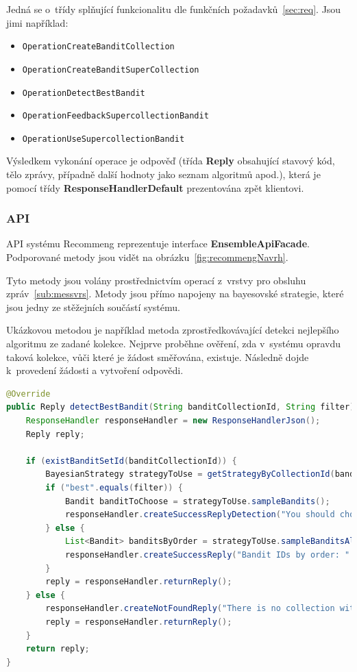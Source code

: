\documentclass[thesis=M,czech]{FITthesis}[2014/05/07]
\begin{document}
Jedná se o~třídy splňující funkcionalitu dle funkčních požadavků~\ref{sec:req}. Jsou jimi například:

\begin{itemize}
	\item \texttt{OperationCreateBanditCollection}
	\item \texttt{OperationCreateBanditSuperCollection}	
	\item \texttt{OperationDetectBestBandit}
	\item \texttt{OperationFeedbackSupercollectionBandit}
	\item \texttt{OperationUseSupercollectionBandit}			
\end{itemize}

Výsledkem vykonání operace je odpověď (třída \textbf{Reply} obsahující stavový kód, tělo zprávy, případně další hodnoty jako seznam algoritmů apod.), která je pomocí třídy \textbf{ResponseHandlerDefault} prezentována zpět klientovi.

\subsubsection{API}
API systému Recommeng reprezentuje interface \textbf{EnsembleApiFacade}. Podporované metody jsou vidět na obrázku~\ref{fig:recommengNavrh}.

Tyto metody jsou volány prostřednictvím operací z~vrstvy pro obsluhu zpráv~\ref{sub:messvrs}. Metody jsou přímo napojeny na bayesovské strategie, které jsou jedny ze stěžejních součástí systému.

Ukázkovou metodou je například metoda zprostředkovávající detekci nejlepšího algoritmu ze zadané kolekce. Nejprve proběhne ověření, zda v~systému opravdu taková kolekce, vůči které je žádost směřována, existuje. Následně dojde k~provedení žádosti a vytvoření odpovědi.

\begin{lstlisting}[language=java]
@Override
public Reply detectBestBandit(String banditCollectionId, String filter) {
    ResponseHandler responseHandler = new ResponseHandlerJson();
    Reply reply;

    if (existBanditSetId(banditCollectionId)) {
        BayesianStrategy strategyToUse = getStrategyByCollectionId(banditCollectionId);
        if ("best".equals(filter)) {
            Bandit banditToChoose = strategyToUse.sampleBandits();            
            responseHandler.createSuccessReplyDetection("You should choose bandit with name " + banditToChoose.getName() + " now. He is the best for this context.", banditToChoose.getId(), banditToChoose.getName(), strategyToUse.getId());
        } else {
            List<Bandit> banditsByOrder = strategyToUse.sampleBanditsAll(banditCollectionId);
            responseHandler.createSuccessReply("Bandit IDs by order: " + banditsByOrder.toString());
        }
        reply = responseHandler.returnReply();
    } else {
        responseHandler.createNotFoundReply("There is no collection with ID " + banditCollectionId + " in application.");
        reply = responseHandler.returnReply();
    }
    return reply;
}
\end{lstlisting}
\end{document}
